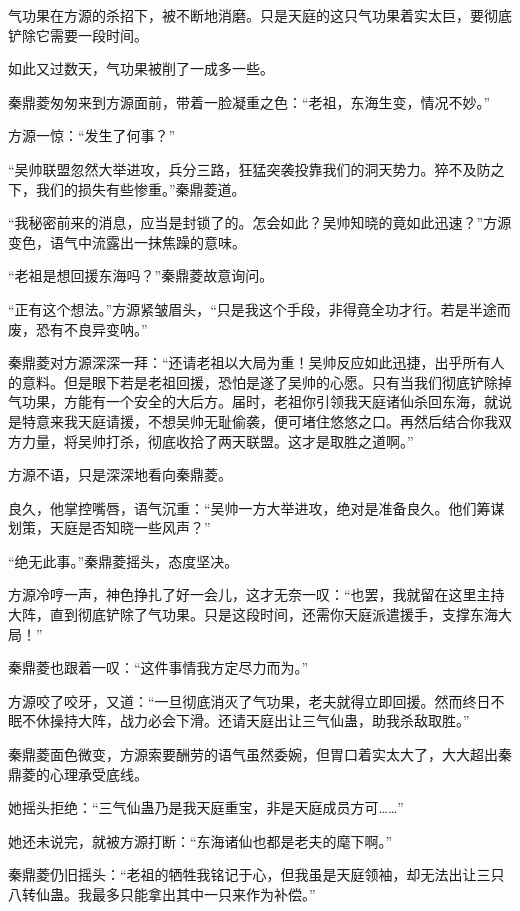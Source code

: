 \begin{this_body}
气功果在方源的杀招下，被不断地消磨。只是天庭的这只气功果着实太巨，要彻底铲除它需要一段时间。

如此又过数天，气功果被削了一成多一些。

秦鼎菱匆匆来到方源面前，带着一脸凝重之色：“老祖，东海生变，情况不妙。”

方源一惊：“发生了何事？”

“吴帅联盟忽然大举进攻，兵分三路，狂猛突袭投靠我们的洞天势力。猝不及防之下，我们的损失有些惨重。”秦鼎菱道。

“我秘密前来的消息，应当是封锁了的。怎会如此？吴帅知晓的竟如此迅速？”方源变色，语气中流露出一抹焦躁的意味。

“老祖是想回援东海吗？”秦鼎菱故意询问。

“正有这个想法。”方源紧皱眉头，“只是我这个手段，非得竟全功才行。若是半途而废，恐有不良异变呐。”

秦鼎菱对方源深深一拜：“还请老祖以大局为重！吴帅反应如此迅捷，出乎所有人的意料。但是眼下若是老祖回援，恐怕是遂了吴帅的心愿。只有当我们彻底铲除掉气功果，方能有一个安全的大后方。届时，老祖你引领我天庭诸仙杀回东海，就说是特意来我天庭请援，不想吴帅无耻偷袭，便可堵住悠悠之口。再然后结合你我双方力量，将吴帅打杀，彻底收拾了两天联盟。这才是取胜之道啊。”

方源不语，只是深深地看向秦鼎菱。

良久，他掌控嘴唇，语气沉重：“吴帅一方大举进攻，绝对是准备良久。他们筹谋划策，天庭是否知晓一些风声？”

“绝无此事。”秦鼎菱摇头，态度坚决。

方源冷哼一声，神色挣扎了好一会儿，这才无奈一叹：“也罢，我就留在这里主持大阵，直到彻底铲除了气功果。只是这段时间，还需你天庭派遣援手，支撑东海大局！”

秦鼎菱也跟着一叹：“这件事情我方定尽力而为。”

方源咬了咬牙，又道：“一旦彻底消灭了气功果，老夫就得立即回援。然而终日不眠不休操持大阵，战力必会下滑。还请天庭出让三气仙蛊，助我杀敌取胜。”

秦鼎菱面色微变，方源索要酬劳的语气虽然委婉，但胃口着实太大了，大大超出秦鼎菱的心理承受底线。

她摇头拒绝：“三气仙蛊乃是我天庭重宝，非是天庭成员方可……”

她还未说完，就被方源打断：“东海诸仙也都是老夫的麾下啊。”

秦鼎菱仍旧摇头：“老祖的牺牲我铭记于心，但我虽是天庭领袖，却无法出让三只八转仙蛊。我最多只能拿出其中一只来作为补偿。”


\end{this_body}
